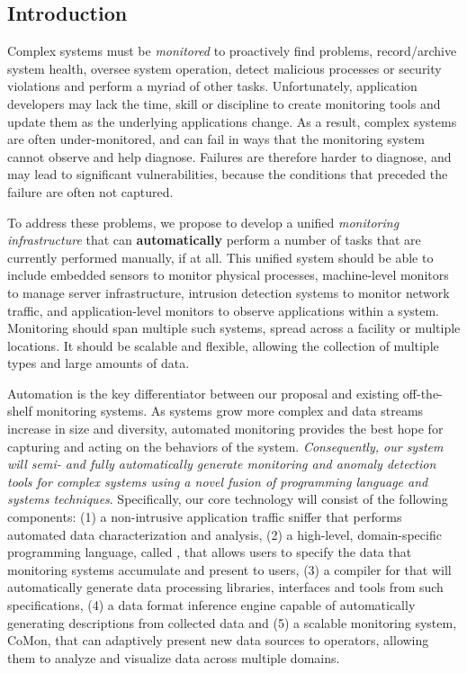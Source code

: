 \subsection{Introduction}
\label{ssec:intro}

Complex systems must be {\em monitored} to proactively find problems,
record/archive system health, oversee system operation, detect
malicious processes or security violations and perform a myriad of
other tasks.  Unfortunately, application developers may lack the time, skill
or discipline to create monitoring tools and update them 
as the underlying applications change. As a result, complex systems
are often under-monitored, and can fail in ways that the monitoring
system cannot observe and help diagnose. Failures are therefore harder
to diagnose, and may lead to significant vulnerabilities, because the 
conditions that preceded the failure are often not captured.

To address these problems, we propose to develop a unified {\em
monitoring infrastructure} that can {\bf automatically} perform a
number of tasks that are currently performed manually, if at all.
This unified system should be able to include embedded sensors to
monitor physical processes, machine-level monitors to manage server
infrastructure, intrusion detection systems to monitor network
traffic, and application-level monitors to observe applications
within a system. Monitoring should span multiple such
systems, spread across a facility or multiple locations. It should be
scalable and flexible, allowing the collection of multiple types
and large amounts of data.


Automation is the key differentiator between our
proposal and existing off-the-shelf monitoring systems. 
As systems grow more complex and data streams increase in size and
diversity, automated monitoring provides the best hope for capturing
and acting on the behaviors of the system. {\em Consequently, our system
will semi- and fully automatically generate monitoring and
anomaly detection tools for complex systems using a novel fusion of
programming language and systems techniques}.
Specifically, our core technology will consist of
the following components: (1) a non-intrusive application traffic
sniffer that performs automated data characterization and analysis,
(2) a high-level, domain-specific programming language, called
\pads{}, that allows users to specify the data that monitoring systems
accumulate and present to users, (3) a compiler for \pads{} that will
automatically generate data processing libraries, interfaces and tools
from such specifications, (4) a data format inference engine capable
of automatically generating \pads{} descriptions from
collected data and (5) a scalable monitoring system, CoMon, that can
adaptively present new data sources to operators, allowing them to
analyze and visualize data across multiple domains.

